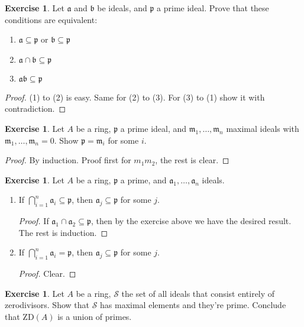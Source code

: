 \documentclass{book}
\theoremstyle{plain}
\theoremstyle{definition}
\newtheorem{exr}[thm]{Exercise}
\theoremstyle{custom_definition}
\begin{document}
\begin{exr}
  Let \(\mathfrak{a}\) and \(\mathfrak{b}\) be ideals, and \(\mathfrak{p}\) a prime ideal. Prove that these conditions are equivalent:
  \begin{enumerate}
    \item \(\mathfrak{a} \subseteq \mathfrak{p}\) or \(\mathfrak{b} \subseteq \mathfrak{p}\)
    \item \(\mathfrak{a} \cap \mathfrak{b} \subseteq \mathfrak{p}\)
    \item \(\mathfrak{a}\mathfrak{b} \subseteq \mathfrak{p}\)
  \end{enumerate}
\end{exr}
\begin{proof}
  (1) to (2) is easy. Same for (2) to (3). For (3) to (1) show it with contradiction.
\end{proof}

\begin{exr}
  Let \(A\) be a ring, \(\mathfrak{p}\) a prime ideal, and \(\mathfrak{m}_1, \ldots, \mathfrak{m}_n\) maximal ideals with \(\mathfrak{m}_1, \ldots, \mathfrak{m}_n = 0\). Show \(\mathfrak{p} = \mathfrak{m}_i\) for some \(i\).
\end{exr}
\begin{proof}
  By induction. Proof first for \(m_1 m_2\), the rest is clear.
\end{proof}

\begin{exr}
  Let \(A\) be a ring, \(\mathfrak{p}\) a prime, and \(\mathfrak{a}_1, \ldots, \mathfrak{a}_n\) ideals.
  \begin{enumerate}
    \item If \(\bigcap_{i=1}^n \mathfrak{a}_i \subseteq \mathfrak{p}\), then \(\mathfrak{a}_j \subseteq \mathfrak{p}\) for some \(j\).
    \begin{proof}
      If \(\mathfrak{a}_1 \cap \mathfrak{a}_2 \subseteq \mathfrak{p}\), then by the exercise above we have the desired result. The rest is induction.
    \end{proof}
    \item If \(\bigcap_{i=1}^n \mathfrak{a}_i = \mathfrak{p}\), then \(\mathfrak{a}_j \subseteq \mathfrak{p}\) for some \(j\).
    \begin{proof}
      Clear.
    \end{proof}
  \end{enumerate}
\end{exr}

\begin{exr}
  Let \(A\) be a ring, \(\mathcal{S}\) the set of all ideals that consist entirely of zerodivisors. Show that \(\mathcal{S}\) has maximal elements and they're prime. Conclude that \(\text{ZD}(A)\) is a union of primes.
\end{exr}
\end{document}

